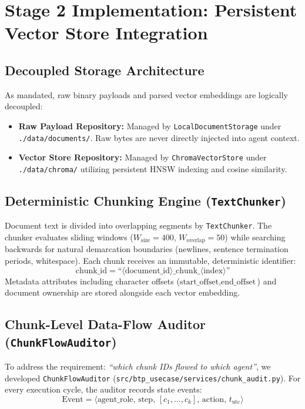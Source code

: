 \documentclass[10pt,a4paper]{article}
\begin{document}
\section{Stage 2 Implementation: Persistent Vector Store Integration}

\subsection{Decoupled Storage Architecture}
As mandated, raw binary payloads and parsed vector embeddings are logically decoupled:
\begin{itemize}
    \item \textbf{Raw Payload Repository:} Managed by \texttt{LocalDocumentStorage} under \texttt{./data/documents/}. Raw bytes are never directly injected into agent context.
    \item \textbf{Vector Store Repository:} Managed by \texttt{ChromaVectorStore} under \texttt{./data/chroma/} utilizing persistent HNSW indexing and cosine similarity.
\end{itemize}

\subsection{Deterministic Chunking Engine (\texttt{TextChunker})}
Document text is divided into overlapping segments by \texttt{TextChunker}. The chunker evaluates sliding windows ($W_{\text{size}} = 400$, $W_{\text{overlap}} = 50$) while searching backwards for natural demarcation boundaries (newlines, sentence termination periods, whitespace). Each chunk receives an immutable, deterministic identifier:
\[
\text{chunk\_id} = \text{``}\langle\text{document\_id}\rangle\text{\_chunk\_}\langle\text{index}\rangle\text{''}
\]
Metadata attributes including character offsets ($\text{start\_offset}, \text{end\_offset}$) and document ownership are stored alongside each vector embedding.

\subsection{Chunk-Level Data-Flow Auditor (\texttt{ChunkFlowAuditor})}
To address the requirement: \textit{``which chunk IDs flowed to which agent''}, we developed \texttt{ChunkFlowAuditor} (\texttt{src/btp\_usecase/services/chunk\_audit.py}). For every execution cycle, the auditor records state events:
\begin{equation}
\text{Event} = \langle \text{agent\_role}, \, \text{step}, \, [c_1, \dots, c_k], \, \text{action}, \, t_{\text{utc}} \rangle
\end{equation}
\end{document}
